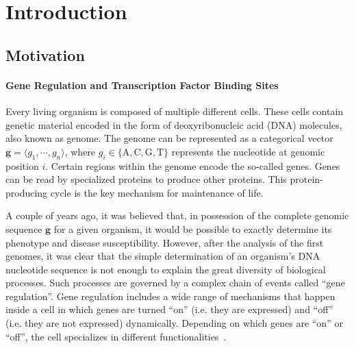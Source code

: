 \chapter{Introduction}
\label{cha:introduction}

\graphicspath{{chapter1/figs/}}

\section{Motivation}
\label{sec:problem.motivation}

\subsubsection{Gene Regulation and Transcription Factor Binding Sites}

Every living organism is composed of multiple different cells. These cells contain genetic material encoded in the form of deoxyribonucleic acid (DNA) molecules, also known as genome. The genome can be represented as a categorical vector $\mathbf{g} = \langle g_1, \cdots, g_n \rangle$, where $g_i \in \{\text{A},\text{C},\text{G},\text{T}\}$ represents the nucleotide at genomic position $i$. Certain regions within the genome encode the so-called genes. Genes can be read by specialized proteins to produce other proteins. This protein-producing cycle is the key mechanism for maintenance of life.

A couple of years ago, it was believed that, in possession of the complete genomic sequence $\mathbf{g}$ for a given organism, it would be possible to exactly determine its phenotype and disease susceptibility. However, after the analysis of the first genomes, it was clear that the simple determination of an organism's DNA nucleotide sequence is not enough to explain the great diversity of biological processes. Such processes are governed by a complex chain of events called ``gene regulation''. Gene regulation includes a wide range of mechanisms that happen inside a cell in which genes are turned ``on'' (i.e. they are expressed) and ``off'' (i.e. they are not expressed) dynamically. Depending on which genes are ``on'' or ``off'', the cell specializes in different functionalities~\citep{alberts2007}.

